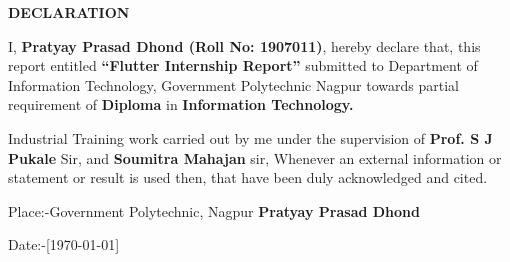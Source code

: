 \begin{center}
{\Large{\bf{DECLARATION}}}
\end{center}

\noindent

I, \textbf{Pratyay Prasad Dhond (Roll No: 1907011)}, hereby declare that, this report entitled \textbf{``Flutter Internship Report”} submitted to Department of Information Technology, Government Polytechnic Nagpur towards
partial requirement of \textbf{ Diploma} in \textbf{Information Technology.} 
\par Industrial Training work carried out by me under the supervision of \textbf{Prof. S J Pukale }Sir, and \textbf{Soumitra Mahajan} sir, Whenever an external information or statement or result is used then, that have been duly acknowledged and cited.

\vspace{4cm}

\noindent Place:-Government Polytechnic, Nagpur \hfill \textbf{Pratyay Prasad Dhond}

\noindent Date:-[\today]

\clearpage
